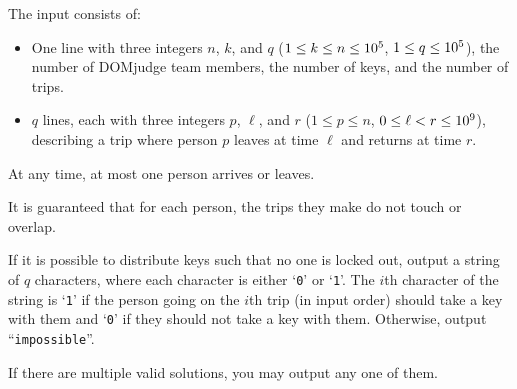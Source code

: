 \begin{Input}
    The input consists of:
    \begin{itemize}
		\item One line with three integers $n$, $k$, and $q$ ($1\le k\le n\le 10^5$, $1\le q\le 10^5$),
			the number of DOMjudge team members,
			the number of keys, and the number of trips.
		\item $q$ lines, each with three integers $p$, $\ell$, and $r$ ($1\le p \le n$, $0\leq \ell < r\le 10^9$),
            describing a trip where person $p$ leaves at time $\ell$ and returns at time $r$.
    \end{itemize}
    At any time, at most one person arrives or leaves.

	It is guaranteed that for each person, the trips they make do not touch or overlap.
\end{Input}

\begin{Output}
	If it is possible to distribute keys such that no one is locked out, output
	a string of $q$ characters,
	where each character is either `\texttt{0}' or `\texttt{1}'.
	The $i$th character of the string is `\texttt{1}' if the
	person going on the $i$th trip (in input order) should take a key with them and `\texttt{0}'
	if they should not take a key with them. Otherwise, output ``\texttt{impossible}''.

	If there are multiple valid solutions, you may output any one of them.
\end{Output}
